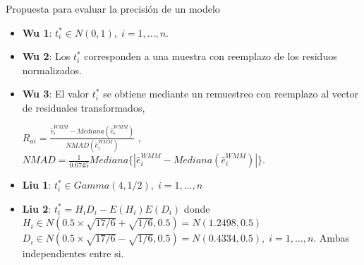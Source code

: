 \documentclass[serif, aspectratio=169]{beamer}
\begin{document}
\begin{frame}{Propuesta para evaluar la precisión de un modelo}
	
	\begin{itemize}
		\item \textbf{Wu 1}: $t^{*}_{i} \in N(0,1) , \; i= 1,\dots ,n$.
		
		\item \textbf{Wu 2}: Los $t^{*}_{i}$ corresponden a una muestra con reemplazo de los residuos normalizados.
		
		\item\textbf{ Wu 3}: El valor $t^{*}_{i}$ se obtiene mediante un remuestreo con reemplazo al vector de residuales transformados,
		
		\begin{center}
			{\large $R_{ai} = \frac{\hat{e}^{WMM}_{i} - Mediana(\hat{e}^{WMM}_{i})}{ NMAD(\hat{e}^{WMM}_{i})  }$} , $NMAD = \frac{1}{0.6745} Mediana\{ | \hat{e}^{WMM}_{i} - Mediana(\hat{e}^{WMM}_{i}) | \}$.
		\end{center}
		\vspace{0.2cm}
		
		\item \textbf{Liu 1}: $ t^{*}_{i} \in Gamma(4, 1/2),\; i= 1,\dots ,n$
	
		\item \textbf{Liu 2}: $t^{*}_{i} = H_{i}D_{i}- E(H_{i})E(D_{i}) $ donde \\
		
		$H_{i} \in N( 0.5\times \sqrt{17/6} + \sqrt{1/6} ,  0.5) = N(1.2498, 0.5) $ \\
		$D_{i} \in N( 0.5 \times \sqrt{17/6} - \sqrt{1/6} ,  0.5) = N(0.4334, 0.5), \; i= 1,\dots ,n$. Ambas independientes entre si.
		
	\end{itemize}
	
\end{frame}
\end{document}
